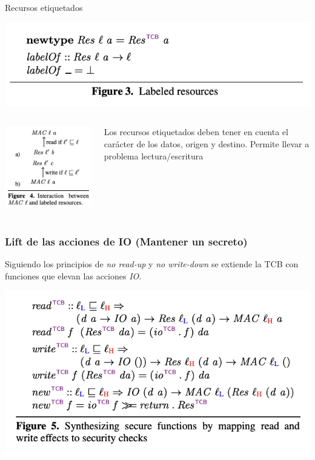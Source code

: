 \documentclass{beamer}
\begin{document}
\begin{frame}{Recursos etiquetados}
    
    \begin{center}
        \includegraphics[scale=0.7]{figure3.png}
    \end{center}
    \begin{columns}
            \begin{center}
                \includegraphics[scale=0.7]{figure4.png}
            \end{center}
        Los recursos etiquetados deben tener en cuenta el carácter de los datos, origen y destino. Permite llevar a problema lectura/escritura
    \end{columns}
\end{frame}

\begin{frame}
    \frametitle{Lift de las acciones de IO (Mantener un secreto)}
    Siguiendo los principios de \textit{no read-up} y \textit{no write-down} se extiende la TCB con funciones que elevan las acciones \textit{IO}.

    \begin{center}
        \includegraphics[scale=0.7]{figure5.png}
    \end{center}
\end{frame}
\end{document}
